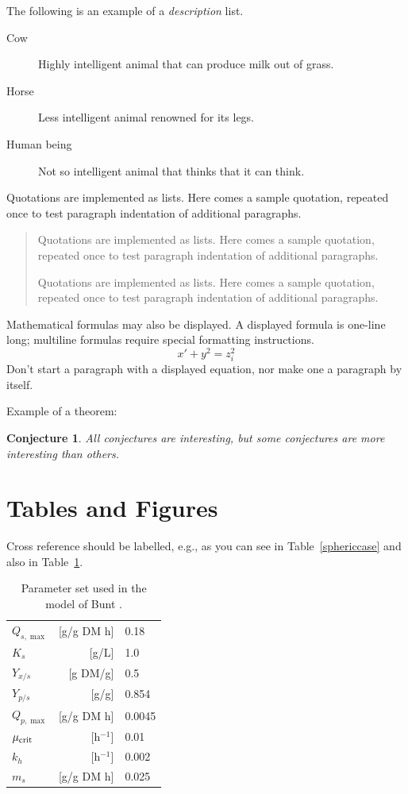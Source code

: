 \documentclass{river-journal}
\newtheorem{guess}{Conjecture}
\begin{document}
The following is an example of a {\em description} list.
\begin{description}
\item[Cow] Highly intelligent animal that can produce milk out of grass.
\item[Horse] Less intelligent animal renowned for its legs.
\item[Human being] Not so intelligent animal that thinks that it can think.
\end{description}

Quotations are implemented as lists. Here comes a sample quotation,
repeated once to test paragraph indentation of additional
paragraphs.
\begin{quotation}
Quotations are implemented as lists. Here comes a sample quotation,
repeated once to test paragraph indentation of additional paragraphs.

Quotations are implemented as lists. Here comes a sample quotation,
repeated once to test paragraph indentation of additional paragraphs.
\end{quotation}

Mathematical formulas may also be displayed.  A displayed formula is
one-line long; multiline formulas require special formatting
instructions.
   \[  x' + y^{2} = z_{i}^{2}\]
Don't start a paragraph with a displayed equation, nor make
one a paragraph by itself.

Example of a theorem:


\begin{guess}
All conjectures are interesting, but some conjectures are more
interesting than others.
\end{guess}


\section{Tables and Figures}

Cross reference should be labelled, e.g., as you can see in
Table~\ref{sphericcase} and also in Table~\ref{parset}.


\begin{table} %
\caption[]{Parameter set used in the model of Bunt \cite{Bunt}. }\label{parset}
\begin{tabular}{lrl}
\hline
$Q_{s,\max}$   & [g/g DM h]  & 0.18\\
$K_{s}$       & [g/L]        & 1.0\\
$Y_{x/s}$     & [g DM/g]     & 0.5\\
$Y_{p/s}$     & [g/g]        & 0.854\\
$Q_{p,\max}$   & [g/g DM h]  & 0.0045\\
$\mu_{\rm crit}$  & [h$^{-1}$]  & 0.01\\
$k_{h}$       & [h$^{-1}$]  & 0.002\\
$m_{s}$       & [g/g DM h]  & 0.025\\
\hline
\end{tabular}
\end{table}
\end{document}
